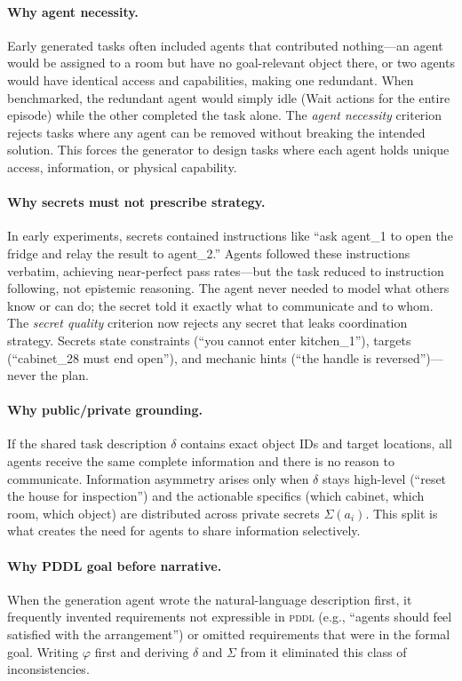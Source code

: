 \documentclass{article} %
\newcommand{\goal}{\varphi}
\newcommand{\taskdesc}{\delta}
\newcommand{\pddl}{\textsc{pddl}}
\begin{document}
\paragraph{Why agent necessity.} Early generated tasks often included agents that contributed nothing---an agent would be assigned to a room but have no goal-relevant object there, or two agents would have identical access and capabilities, making one redundant. When benchmarked, the redundant agent would simply idle (Wait actions for the entire episode) while the other completed the task alone. The \emph{agent necessity} criterion rejects tasks where any agent can be removed without breaking the intended solution. This forces the generator to design tasks where each agent holds unique access, information, or physical capability.

\paragraph{Why secrets must not prescribe strategy.} In early experiments, secrets contained instructions like ``ask agent\_1 to open the fridge and relay the result to agent\_2.'' Agents followed these instructions verbatim, achieving near-perfect pass rates---but the task reduced to instruction following, not epistemic reasoning. The agent never needed to model what others know or can do; the secret told it exactly what to communicate and to whom. The \emph{secret quality} criterion now rejects any secret that leaks coordination strategy. Secrets state constraints (``you cannot enter kitchen\_1''), targets (``cabinet\_28 must end open''), and mechanic hints (``the handle is reversed'')---never the plan.

\paragraph{Why public/private grounding.} If the shared task description $\taskdesc$ contains exact object IDs and target locations, all agents receive the same complete information and there is no reason to communicate. Information asymmetry arises only when $\taskdesc$ stays high-level (``reset the house for inspection'') and the actionable specifics (which cabinet, which room, which object) are distributed across private secrets $\Sigma(a_i)$. This split is what creates the need for agents to share information selectively.

\paragraph{Why PDDL goal before narrative.} When the generation agent wrote the natural-language description first, it frequently invented requirements not expressible in \pddl{} (e.g., ``agents should feel satisfied with the arrangement'') or omitted requirements that were in the formal goal. Writing $\goal$ first and deriving $\taskdesc$ and $\Sigma$ from it eliminated this class of inconsistencies.
\end{document}
